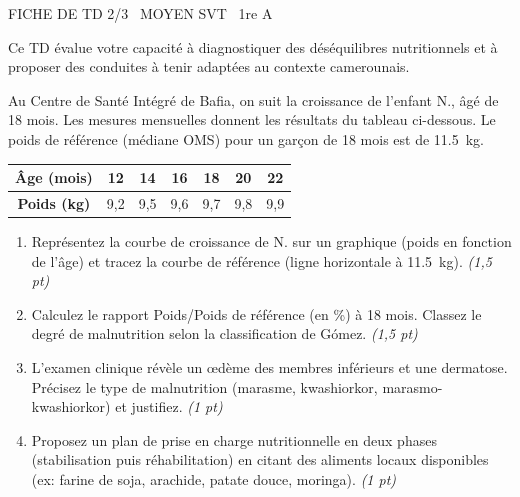 \documentclass[11pt]{article}
\begin{document}
\begin{tcolorbox}[enhanced,colback=popink,colframe=popink,arc=10pt,boxrule=0pt,left=12pt,right=12pt,top=9pt,bottom=9pt]
{\color{white}\popxbold\small FICHE DE TD 2/3 \textbullet\ MOYEN \hfill SVT \textbullet\ 1re A\par}
\end{tcolorbox}
\vspace{4pt}
Ce TD évalue votre capacité à diagnostiquer des déséquilibres nutritionnels et à proposer des conduites à tenir adaptées au contexte camerounais.

\begin{exercice}
Au Centre de Santé Intégré de Bafia, on suit la croissance de l'enfant N., âgé de 18 mois. Les mesures mensuelles donnent les résultats du tableau ci-dessous. Le poids de référence (médiane OMS) pour un garçon de 18 mois est de \SI{11,5}{\kilo\gram}.

\begin{tabular}{|c|c|c|c|c|c|c|}
\hline
\textbf{Âge (mois)} & 12 & 14 & 16 & 18 & 20 & 22 \\
\hline
\textbf{Poids (kg)} & 9,2 & 9,5 & 9,6 & 9,7 & 9,8 & 9,9 \\
\hline
\end{tabular}

\begin{enumerate}
    \item Représentez la courbe de croissance de N. sur un graphique (poids en fonction de l'âge) et tracez la courbe de référence (ligne horizontale à \SI{11,5}{\kilo\gram}). \textit{(1,5 pt)}
    \item Calculez le rapport Poids/Poids de référence (en \%) à 18 mois. Classez le degré de malnutrition selon la classification de Gómez. \textit{(1,5 pt)}
    \item L'examen clinique révèle un œdème des membres inférieurs et une dermatose. Précisez le type de malnutrition (marasme, kwashiorkor, marasmo-kwashiorkor) et justifiez. \textit{(1 pt)}
    \item Proposez un plan de prise en charge nutritionnelle en deux phases (stabilisation puis réhabilitation) en citant des aliments locaux disponibles (ex: farine de soja, arachide, patate douce, moringa). \textit{(1 pt)}
\end{enumerate}
\end{exercice}
\end{document}
